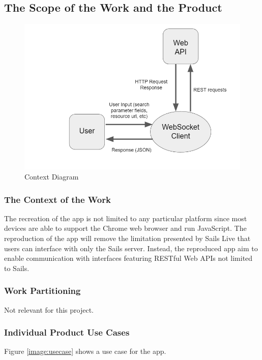 \documentclass[12pt, titlepage]{article}
\begin{document}
\subsection{The Scope of the Work and the Product}
\begin{center}
	\begin{figure}[h!]
		\includegraphics[width=1\linewidth, center]{images/srs-io-dia}
		\caption{Context Diagram}
	\end{figure}
\end{center}
\subsubsection{The Context of the Work}
The recreation of the app is not limited to any particular platform since most devices are able to support the Chrome web browser and run JavaScript. The reproduction of the app will remove the limitation presented by Sails Live that users can interface with only the Sails server. Instead, the reproduced app aim to enable communication with interfaces featuring RESTful Web APIs not limited to Sails.

\subsubsection{Work Partitioning}
Not relevant for this project.

\subsubsection{Individual Product Use Cases}
Figure \ref{image:usecase} shows a use case for the app.
\end{document}
